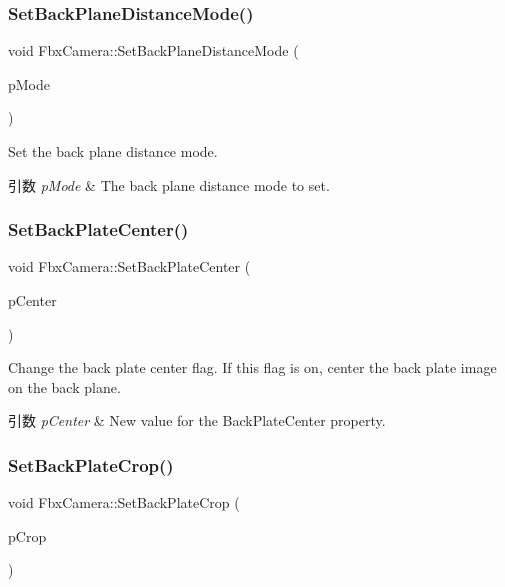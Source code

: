 \subsubsection{\texorpdfstring{Set\+Back\+Plane\+Distance\+Mode()}{SetBackPlaneDistanceMode()}}
{\footnotesize\ttfamily void Fbx\+Camera\+::\+Set\+Back\+Plane\+Distance\+Mode (\begin{DoxyParamCaption}\item[{\hyperlink{class_fbx_camera_a79e74898d117e741c3fbd10b1ef21c79}{E\+Front\+Back\+Plane\+Distance\+Mode}}]{p\+Mode }\end{DoxyParamCaption})}

Set the back plane distance mode. 
\begin{DoxyParams}{引数}
{\em p\+Mode} & The back plane distance mode to set. \\
\hline
\end{DoxyParams}
\mbox{\label{class_fbx_camera_a73af7339e5a68e655a930b2e9570e24d}} 
\subsubsection{\texorpdfstring{Set\+Back\+Plate\+Center()}{SetBackPlateCenter()}}
{\footnotesize\ttfamily void Fbx\+Camera\+::\+Set\+Back\+Plate\+Center (\begin{DoxyParamCaption}\item[{bool}]{p\+Center }\end{DoxyParamCaption})}

Change the back plate center flag. If this flag is on, center the back plate image on the back plane. 
\begin{DoxyParams}{引数}
{\em p\+Center} & New value for the Back\+Plate\+Center property. \\
\hline
\end{DoxyParams}
\mbox{\label{class_fbx_camera_ab5f5ab76b27d70b61a256c364f183024}} 
\subsubsection{\texorpdfstring{Set\+Back\+Plate\+Crop()}{SetBackPlateCrop()}}
{\footnotesize\ttfamily void Fbx\+Camera\+::\+Set\+Back\+Plate\+Crop (\begin{DoxyParamCaption}\item[{bool}]{p\+Crop }\end{DoxyParamCaption})}

